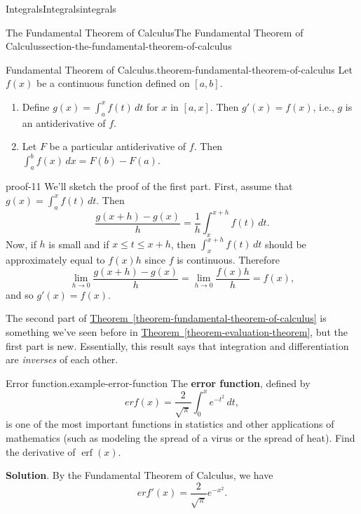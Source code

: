 \documentclass[oneside,10pt,]{book}
\newcommand{\terminology}[1]{\textbf{#1}}
\numberwithin{equation}{section}
\newcommand{\erf}[1]{\operatorname{erf} #1}
\begin{document}
\begin{chapterptx}{Integrals}{}{Integrals}{}{}{integrals}
\begin{sectionptx}{The Fundamental Theorem of Calculus}{}{The Fundamental Theorem of Calculus}{}{}{section-the-fundamental-theorem-of-calculus}
\begin{theorem}{Fundamental Theorem of Calculus.}{}{theorem-fundamental-theorem-of-calculus}
\hypertarget{p-466}{}%
Let \(f(x)\) be a continuous function defined on \([a,b]\).%
\leavevmode%
\begin{enumerate}
\item\hypertarget{li-40}{}Define \(g(x) = \int_{a}^{x}f(t)\,dt\) for \(x\) in \([a,x]\). Then \(g'(x) = f(x)\), i.e., \(g\) is an antiderivative of \(f\).%
\item\hypertarget{li-41}{}Let \(F\) be a particular antiderivative of \(f\). Then \(\int_{a}^{b}f(x)\,dx = F(b) - F(a).\)%
\end{enumerate}
\end{theorem}
\begin{proofptx}{}{proof-11}
\hypertarget{p-467}{}%
We'll sketch the proof of the first part. First, assume that \(g(x) = \int_{a}^{x}f(t)\,dt\). Then%
\begin{equation*}
\frac{g(x+h)-g(x)}{h} = \frac{1}{h}\int_{x}^{x+h}f(t)\,dt.
\end{equation*}
Now, if \(h\) is small and if \(x\leq t\leq x+h\), then \(\int_{x}^{x+h}f(t)\,dt\) should be approximately equal to \(f(x)h\) since \(f\) is continuous. Therefore%
\begin{equation*}
\lim_{h\to0}\frac{g(x+h)-g(x)}{h} = \lim_{h\to0}\frac{f(x)h}{h} = f(x),
\end{equation*}
and so \(g'(x) = f(x)\).%
\end{proofptx}
\hypertarget{p-468}{}%
The second part of \hyperref[theorem-fundamental-theorem-of-calculus]{Theorem~\ref{theorem-fundamental-theorem-of-calculus}} is something we've seen before in \hyperref[theorem-evaluation-theorem]{Theorem~\ref{theorem-evaluation-theorem}}, but the first part is new. Essentially, this result says that integration and differentiation are \emph{inverses} of each other.%
\begin{example}{Error function.}{example-error-function}%
\hypertarget{p-469}{}%
The \terminology{error function}, defined by%
\begin{equation*}
erf(x) = \frac{2}{\sqrt{\pi}}\int_{0}^{x}e^{-t^{2}}\,dt,
\end{equation*}
is one of the most important functions in statistics and other applications of mathematics (such as modeling the spread of a virus or the spread of heat). Find the derivative of \(\erf(x)\).%
\par\smallskip%
\noindent\textbf{Solution}.\hypertarget{solution-102}{}\quad%
\hypertarget{p-470}{}%
By the Fundamental Theorem of Calculus, we have%
\begin{equation*}
erf'(x) = \frac{2}{\sqrt{\pi}}e^{-x^{2}}.

\end{equation*}
\end{example}
\end{sectionptx}
\end{chapterptx}
\end{document}
